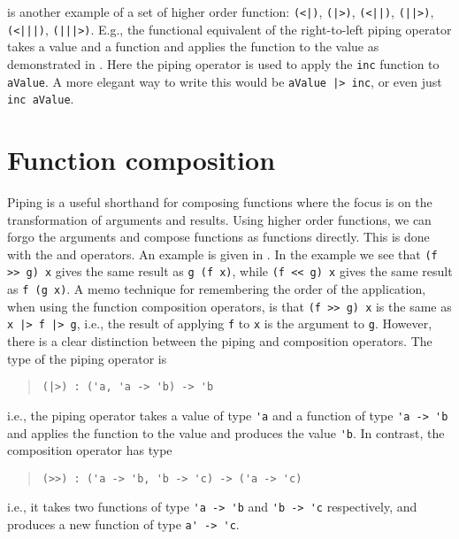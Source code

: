  is another example of a set of higher order function: \lstinline{(<|)}, \lstinline{(|>)}, \lstinline{(<||)}, \lstinline{(||>)}, \lstinline{(<|||)}, \lstinline{(|||>)}. E.g., the functional equivalent of the right-to-left piping operator takes a value and a function and applies the function to the value as demonstrated in .
%
%
Here the piping operator is used to apply the \lstinline{inc} function to \lstinline{aValue}. A more elegant way to write this would be \lstinline{aValue |> inc}, or even just \lstinline{inc aValue}.

\section{Function composition}
Piping is a useful shorthand for composing functions where the focus is on the transformation of arguments and results. Using higher order functions, we can forgo the arguments and compose functions as functions directly. This is done with the \idx[>>@\lstinline{>>}]{\lexeme{>>}} and \idx[<<@\lstinline{<<}]{\lexeme{<<}} %
operators. An example is given in .
%
%
In the example we see that \lstinline{(f >> g) x} gives the same result as \lstinline{g (f x)}, while \lstinline{(f << g) x} %
 gives the same result as \lstinline{f (g x)}. A memo technique for remembering the order of the application, when using the function composition operators, is that \lstinline{(f >> g) x} is the same as \lstinline{x |> f |> g}, i.e., the result of applying \lstinline{f} to \lstinline{x} is the argument to \lstinline{g}. However, there is a clear distinction between the piping and composition operators. The type of the piping operator is
 \begin{quote}
   \lstinline{(|>) : ('a, 'a -> 'b) -> 'b}
 \end{quote}
i.e., the piping operator takes a value of type \lstinline{'a} and a function of type \lstinline{'a -> 'b} and applies the function to the value and produces the value \lstinline{'b}. In contrast, the composition operator has type
\begin{quote}
  \lstinline{(>>) : ('a -> 'b, 'b -> 'c) -> ('a -> 'c)}
\end{quote}
i.e., it takes two functions of type \lstinline{'a -> 'b} and \lstinline{'b -> 'c} respectively, and produces a new function of type \lstinline{a' -> 'c}.

